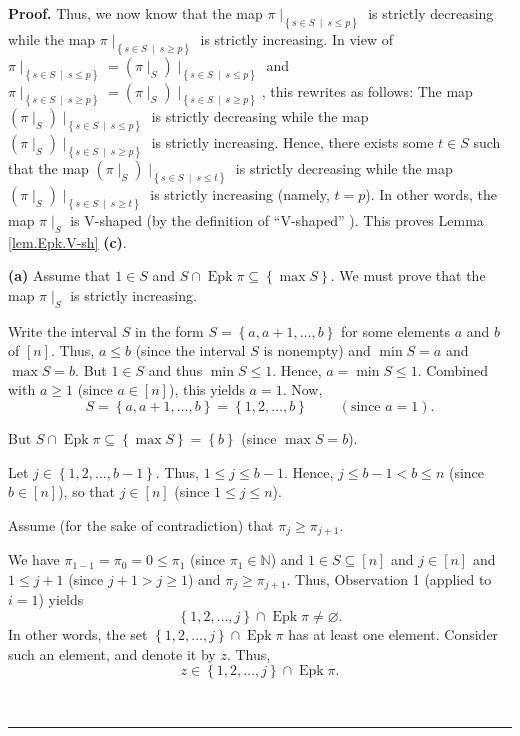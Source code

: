 \documentclass[numbers=enddot,12pt,final,onecolumn,notitlepage]{scrartcl}%
\theoremstyle{definition}
\newenvironment{proof}[1][Proof]{\noindent\textbf{#1.} }{\ \rule{0.5em}{0.5em}}
\newenvironment{verlong}{}{}
\begin{document}
\begin{verlong}
\begin{proof}
Thus, we now know that the map $\pi\mid_{\left\{  s\in S\ \mid\ s\leq
p\right\}  }$ is strictly decreasing while the map $\pi\mid_{\left\{  s\in
S\ \mid\ s\geq p\right\}  }$ is strictly increasing. In view of $\pi
\mid_{\left\{  s\in S\ \mid\ s\leq p\right\}  }=\left(  \pi\mid_{S}\right)
\mid_{\left\{  s\in S\ \mid\ s\leq p\right\}  }$ and $\pi\mid_{\left\{  s\in
S\ \mid\ s\geq p\right\}  }=\left(  \pi\mid_{S}\right)  \mid_{\left\{  s\in
S\ \mid\ s\geq p\right\}  }$, this rewrites as follows: The map $\left(
\pi\mid_{S}\right)  \mid_{\left\{  s\in S\ \mid\ s\leq p\right\}  }$ is
strictly decreasing while the map $\left(  \pi\mid_{S}\right)  \mid_{\left\{
s\in S\ \mid\ s\geq p\right\}  }$ is strictly increasing. Hence, there exists
some $t\in S$ such that the map $\left(  \pi\mid_{S}\right)  \mid_{\left\{
s\in S\ \mid\ s\leq t\right\}  }$ is strictly decreasing while the map
$\left(  \pi\mid_{S}\right)  \mid_{\left\{  s\in S\ \mid\ s\geq t\right\}  }$
is strictly increasing (namely, $t=p$). In other words, the map $\pi\mid_{S}$
is V-shaped (by the definition of \textquotedblleft V-shaped\textquotedblright%
). This proves Lemma \ref{lem.Epk.V-sh} \textbf{(c)}.

\textbf{(a)} Assume that $1\in S$ and $S\cap\operatorname{Epk}\pi
\subseteq\left\{  \max S\right\}  $. We must prove that the map $\pi\mid_{S}$
is strictly increasing.

Write the interval $S$ in the form $S=\left\{  a,a+1,\ldots,b\right\}  $ for
some elements $a$ and $b$ of $\left[  n\right]  $. Thus, $a\leq b$ (since the
interval $S$ is nonempty) and $\min S=a$ and $\max S=b$. But $1\in S$ and thus
$\min S\leq1$. Hence, $a=\min S\leq1$. Combined with $a\geq1$ (since
$a\in\left[  n\right]  $), this yields $a=1$. Now,%
\[
S=\left\{  a,a+1,\ldots,b\right\}  =\left\{  1,2,\ldots,b\right\}
\ \ \ \ \ \ \ \ \ \ \left(  \text{since }a=1\right)  .
\]


But $S\cap\operatorname{Epk}\pi\subseteq\left\{  \max S\right\}  =\left\{
b\right\}  $ (since $\max S=b$).

Let $j\in\left\{  1,2,\ldots,b-1\right\}  $. Thus, $1\leq j\leq b-1$. Hence,
$j\leq b-1<b\leq n$ (since $b\in\left[  n\right]  $), so that $j\in\left[
n\right]  $ (since $1\leq j\leq n$).

Assume (for the sake of contradiction) that $\pi_{j}\geq\pi_{j+1}$.

We have $\pi_{1-1}=\pi_{0}=0\leq\pi_{1}$ (since $\pi_{1}\in\mathbb{N}$) and
$1\in S\subseteq\left[  n\right]  $ and $j\in\left[  n\right]  $ and $1\leq
j+1$ (since $j+1>j\geq1$) and $\pi_{j}\geq\pi_{j+1}$. Thus, Observation 1
(applied to $i=1$) yields
\[
\left\{  1,2,\ldots,j\right\}  \cap\operatorname{Epk}\pi\neq\varnothing.
\]
In other words, the set $\left\{  1,2,\ldots,j\right\}  \cap
\operatorname{Epk}\pi$ has at least one element. Consider such an element,
and denote it by $z$. Thus,%
\[
z\in\left\{  1,2,\ldots,j\right\}  \cap\operatorname{Epk}\pi.
\]



\end{proof}
\end{verlong}
\end{document}
